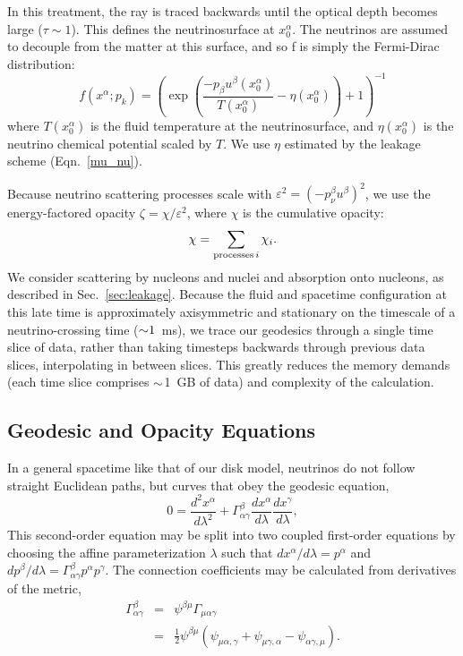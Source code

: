 In this treatment, the ray is traced backwards until the optical depth becomes
large ($\tau\sim1$). This defines the neutrinosurface at $x_0^\alpha$. The
neutrinos are assumed to decouple from the matter at this surface, and so f
is simply the Fermi-Dirac distribution:
\begin{equation}
  \label{eqn:f_fermi_dirac}
  f(x^\alpha;p_k) =
  \left(\exp\left(\frac{-p_\beta u^\beta(x_0^\alpha)}{T(x_0^\alpha)}
  -\eta(x_0^\alpha) \right)+1\right)^{-1}
\end{equation}
where $T(x_0^\alpha)$ is the fluid temperature at the neutrinosurface, and
$\eta(x_0^\alpha)$ is the neutrino chemical potential scaled by $T$.
We use $\eta$ estimated by the leakage scheme (Eqn.~\ref{mu_nu}).

Because neutrino scattering processes scale with
$\varepsilon^2=(-p_{\nu}^\beta u^\beta)^2$,
we use the energy-factored opacity $\zeta=\chi/\varepsilon^2$, where $\chi$ is
the cumulative opacity:
\begin{equation}
  \chi = \sum\limits_{{\rm processes}\, i} \chi_i.
\end{equation}
We consider scattering by nucleons and nuclei and absorption onto nucleons,
as described in Sec.~\ref{sec:leakage}.
Because the fluid and spacetime configuration at this late time is approximately
axisymmetric and stationary on the timescale of a neutrino-crossing time
($\mathord{\sim}1$~ms), we trace our geodesics through a single time slice of data,
rather than taking timesteps backwards through previous data slices,
interpolating in between slices. This greatly reduces the memory demands (each
time slice comprises $\mathord{\sim}$1~GB of data) and complexity of the calculation.

\subsection{Geodesic and Opacity Equations}
\label{ssec:geodesic}
In a general spacetime like that of our disk model, neutrinos do not follow
straight Euclidean paths, but curves that obey the geodesic equation,
\begin{equation}
  \label{eqn:geodesic}
  0=\frac{d^2x^\alpha}{d\lambda^2} + \Gamma^\beta_{\alpha\gamma}
  \frac{dx^\alpha}{d\lambda}\frac{dx^\gamma}{d\lambda},
\end{equation}
This second-order equation may be split into two coupled first-order equations
by choosing the affine parameterization $\lambda$ such that
$dx^\alpha/d\lambda=p^\alpha$ and
$dp^\beta/d\lambda=\Gamma^\beta_{\alpha\gamma}p^\alpha p^\gamma$.
The connection coefficients may be calculated from derivatives of the metric,
\begin{eqnarray}
  \label{eqn:christoffel}
  \Gamma^\beta_{\alpha\gamma}
  &=& \psi^{\beta\mu}\Gamma_{\mu\alpha\gamma} \nonumber \\
  &=& \frac{1}{2} \psi^{\beta\mu}
  (\psi_{\mu\alpha,\gamma} + \psi_{\mu\gamma,\alpha} - \psi_{\alpha\gamma,\mu}).
\end{eqnarray}


